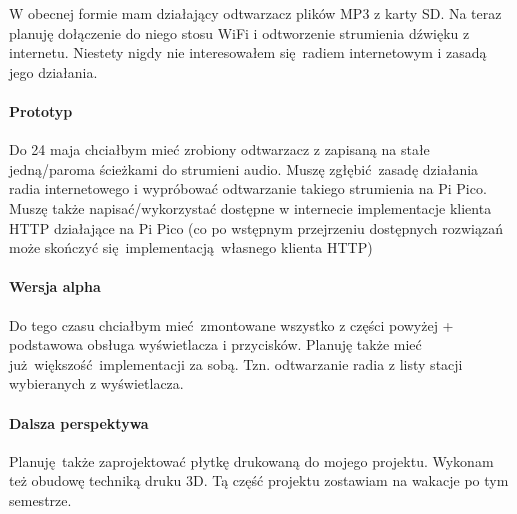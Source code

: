 \documentclass[12pt]{article}
\begin{document}
		W obecnej formie mam działający odtwarzacz plików MP3 z karty SD. Na teraz planuję dołączenie do niego stosu WiFi i odtworzenie strumienia dźwięku z internetu. Niestety nigdy nie interesowałem się radiem internetowym i zasadą jego działania.
		
		\paragraph{Prototyp}
		Do 24 maja chciałbym mieć zrobiony odtwarzacz z zapisaną na stałe jedną/paroma ścieżkami do strumieni audio. Muszę zgłębić zasadę działania radia internetowego i wypróbować odtwarzanie takiego strumienia na Pi Pico. Muszę także napisać/wykorzystać dostępne w internecie implementacje klienta HTTP działające na Pi Pico (co po wstępnym przejrzeniu dostępnych rozwiązań może skończyć się implementacją własnego klienta HTTP)
		
		\paragraph{Wersja alpha}
		Do tego czasu chciałbym mieć zmontowane wszystko z części powyżej + podstawowa obsługa wyświetlacza i przycisków. Planuję także mieć już większość implementacji za sobą. Tzn. odtwarzanie radia z listy stacji wybieranych z wyświetlacza.
		
		\paragraph{Dalsza perspektywa}
		Planuję także zaprojektować płytkę drukowaną do mojego projektu. Wykonam też obudowę techniką druku 3D. Tą część projektu zostawiam na wakacje po tym semestrze.
		 
	
	
\end{document}
